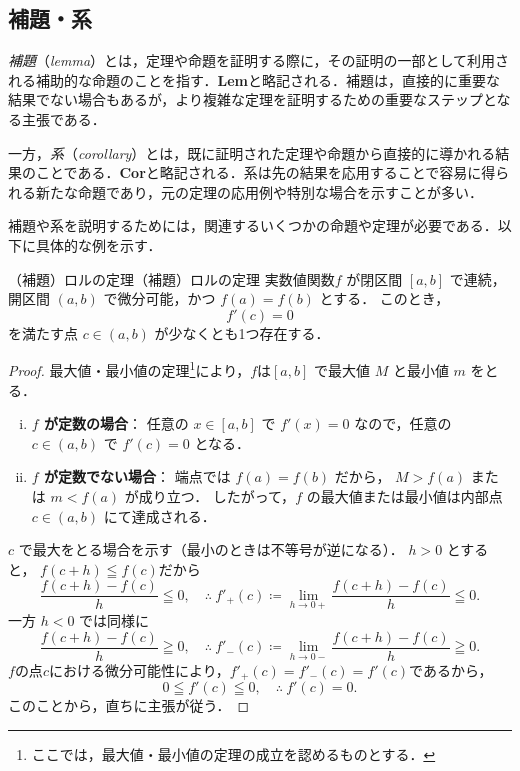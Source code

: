 \subsection{補題・系}

\emph{補題}（\emph{lemma}）とは，定理や命題を証明する際に，その証明の一部として利用される補助的な命題のことを指す．\textbf{Lem}と略記される．補題は，直接的に重要な結果でない場合もあるが，より複雑な定理を証明するための重要なステップとなる主張である．

一方，\emph{系}（\emph{corollary}）とは，既に証明された定理や命題から直接的に導かれる結果のことである．\textbf{Cor}と略記される．系は先の結果を応用することで容易に得られる新たな命題であり，元の定理の応用例や特別な場合を示すことが多い．

補題や系を説明するためには，関連するいくつかの命題や定理が必要である．以下に具体的な例を示す．


\begin{example}{（補題）ロルの定理}{（補題）ロルの定理}
  実数値関数$f$ が閉区間 $[a,b]$ で連続，開区間 $(a,b)$ で微分可能，かつ $f(a)=f(b)$ とする．
  このとき，
  \[
  f'(c)=0
  \]
  を満たす点 $c \in (a,b)$ が少なくとも1つ存在する．
\end{example}

\begin{tleftbar}
\begin{proof}
最大値・最小値の定理\footnote{ここでは，最大値・最小値の定理の成立を認めるものとする．}により，$f$は$[a,b]$ で最大値 $M$ と最小値 $m$ をとる．

\begin{enumerate}[(i)]
  \item \textbf{$f$ が定数の場合}：
  任意の $x \in [a,b]$ で $f'(x)=0$ なので，任意の $c \in(a,b)$ で
  $f'(c)=0$ となる．

  \item \textbf{$f$ が定数でない場合}：
  端点では $f(a)=f(b)$ だから，
  $M>f(a)$ または $m<f(a)$ が成り立つ．
  したがって，$f$ の最大値または最小値は内部点
  $c \in(a,b)$ にて達成される．
\end{enumerate}

$c$ で最大をとる場合を示す（最小のときは不等号が逆になる）．
$h>0$ とすると， $f(c+h) \leqq f(c)$だから
\[
\frac{f(c+h)-f(c)}{h} \leqq 0 ,\quad \therefore ~ f'_+(c) \coloneqq \lim_{h \to 0+} \frac{f(c+h)-f(c)}{h}\leqq 0.
\]
一方 $h<0$ では同様に
\[
\frac{f(c+h)-f(c)}{h}\geqq 0 , \quad \therefore~  f'_-(c)\coloneqq \lim_{h\to0-}\frac{f(c+h)-f(c)}{h}\geqq 0.
\]
$f$の点$c$における微分可能性により，$f'_+(c)=f'_-(c)=f'(c)$であるから，
\[
0\leqq f'(c)\leqq 0 , \quad \therefore ~f'(c)=0.
\]
このことから，直ちに主張が従う．
\end{proof}
\end{tleftbar}


